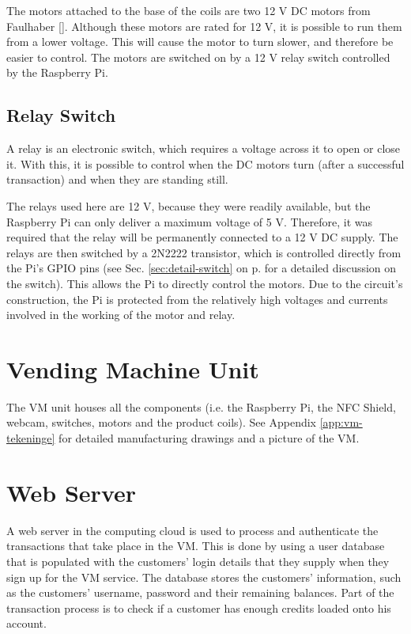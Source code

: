 The motors attached to the base of the coils are two 12 V DC motors from Faulhaber
[\cite{manual:dc-motors}]. Although these motors are rated for 12 V, it is possible to run them
from a lower voltage. This will cause the motor to turn slower, and therefore be easier to
control. The motors are switched on by a 12 V relay switch controlled by the Raspberry Pi.

\subsection{Relay Switch}
\label{sec:relay-switch}

A relay is an electronic switch, which requires a voltage across it to open or close it.
With this, it is possible to control when the DC motors turn (after a successful
transaction) and when they are standing still.

The relays used here are 12 V, because they were readily available, but the
Raspberry Pi can only deliver a maximum voltage of 5 V. Therefore, it was required that the
relay will be permanently connected to a 12 V DC supply. The relays are then switched by a
2N2222 transistor, which is controlled directly from the Pi's GPIO pins (see Sec.
\ref{sec:detail-switch} on p.\pageref{sec:detail-switch} for a detailed discussion on the
switch). This allows the Pi to directly control the motors. Due to the circuit's
construction, the Pi is protected from the relatively high voltages and currents involved
in the working of the motor and relay.

\section{Vending Machine Unit}

The VM unit houses all the components (i.e. the Raspberry Pi, the NFC Shield,
webcam, switches, motors and the product coils). See Appendix \ref{app:vm-tekeninge} 
for detailed manufacturing drawings and a picture of the VM.

\section{Web Server}

A web server in the computing cloud is used to process and authenticate the
transactions that take place in the VM. This is done by
using a user database that is populated with the customers' login details that
they supply when they sign up for the VM service. The database
stores the customers' information, such as the customers' username, password and their
remaining balances. Part of the transaction process is to check if a customer has enough
credits loaded onto his account.

